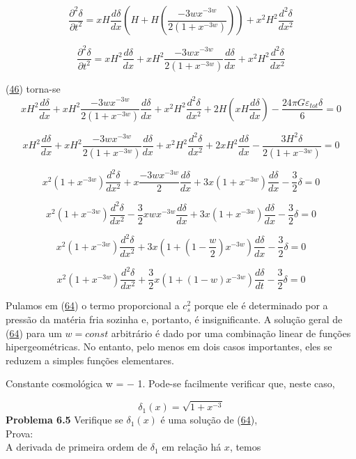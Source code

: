 \documentclass[a4paper,12pt]{article}
\begin{document}
$$\dfrac{\partial^2 \delta}{\partial t^2} = xH\dfrac{d \delta}{d x }\left( H + H \left(\dfrac{-3wx^{-3w}}{2(1 +x^{-3w})} \right)\right) + x^2H^2 \dfrac{d^2 \delta}{d x^2 }$$

$$\dfrac{\partial^2 \delta}{\partial t^2} = xH^2\dfrac{d \delta}{d x }+ xH^2 \dfrac{-3wx^{-3w}}{2(1 +x^{-3w})}\dfrac{d \delta}{d x } + x^2H^2 \dfrac{d^2 \delta}{d x^2 }$$

(\hyperref[eq46]{46}) torna-se
$$xH^2\dfrac{d \delta}{d x }+ xH^2 \dfrac{-3wx^{-3w}}{2(1 +x^{-3w})}\dfrac{d \delta}{d x } + x^2H^2 \dfrac{d^2 \delta}{d x^2 } + 2H\left( xH \dfrac{d \delta}{d x }\right)  -\dfrac{24\pi G\varepsilon_{tot}\delta}{6} = 0$$

$$xH^2\dfrac{d \delta}{d x }+ xH^2 \dfrac{-3wx^{-3w}}{2(1 +x^{-3w})}\dfrac{d \delta}{d x } + x^2H^2 \dfrac{d^2 \delta}{d x^2 } + 2xH^2 \dfrac{d \delta}{d x }  -\dfrac{3H^2\delta}{2(1+x^{-3w})} = 0$$

$$x^2(1+x^{-3w}) \dfrac{d^2 \delta}{d x^2 } +x \dfrac{-3wx^{-3w}}{2}\dfrac{d \delta}{d x } + 3x(1+x^{-3w}) \dfrac{d \delta}{d x }  -\dfrac{3}{2}\delta = 0$$

$$x^2(1+x^{-3w}) \dfrac{d^2 \delta}{d x^2 } -\dfrac{3}{2}xwx^{-3w}\dfrac{d \delta}{d x } + 3x(1+x^{-3w}) \dfrac{d \delta}{d x }  -\dfrac{3}{2}\delta = 0$$

$$x^2(1+x^{-3w}) \dfrac{d^2 \delta}{d x^2 }+ 3x(1+(1-\dfrac{w}{2})x^{-3w}) \dfrac{d \delta}{d x }  -\dfrac{3}{2}\delta = 0$$

\begin{equation}\label{eq64}
	x^2 (1+x^{-3w})\dfrac{d^2\delta}{dx^2} + \dfrac{3}{2}x(1+ (1-w)x^{-3w})\dfrac{d\delta}{dt} - \dfrac{3}{2}\delta = 0
\end{equation}

Pulamos em (\hyperref[eq64]{64}) o termo proporcional a $c_s^2$ porque ele é determinado por
a pressão da matéria fria sozinha e, portanto, é insignificante. A solução geral
de (\hyperref[eq64]{64}) para um $w = const$ arbitrário é dado por uma combinação linear de funções hipergeométricas. No entanto, pelo menos em dois casos importantes, eles se reduzem a simples funções elementares.

Constante cosmológica w = − 1. Pode-se facilmente verificar que, neste caso,

\begin{equation}\label{eq65}
	\delta_1 (x) = \sqrt{1+x^{-3}}
\end{equation}
\textbf {Problema 6.5} Verifique se $\delta_1 (x) $ é uma solução de (\hyperref[eq64]{64}),  \\
Prova:\\
A derivada de primeira ordem de $\delta_1$ em relação há $x$, temos
\end{document}
